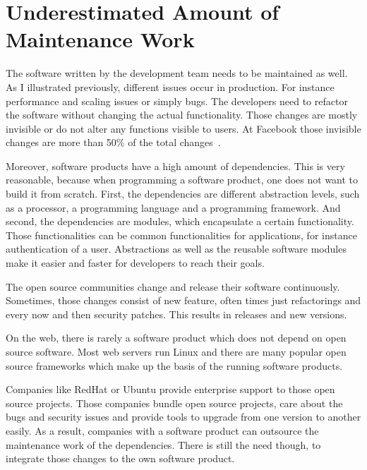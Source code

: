 \section{Underestimated Amount of Maintenance Work}

The software written by the development team needs to be maintained as well. As I
illustrated previously, different issues occur in production. For instance performance and
scaling issues or simply bugs. The developers need to refactor the software without
changing the actual functionality. Those changes are mostly invisible or do not alter any
functions visible to users. At Facebook those invisible changes are more than 50\% of the
total changes~\cite{dev_at_fb}.

Moreover, software products have a high amount of dependencies. This is very reasonable,
because when programming a software product, one does not want to build it from
scratch. First, the dependencies are different abstraction levels, such as a processor,
a programming language and a programming framework. And second, the dependencies are
modules, which encapsulate a certain functionality. Those functionalities can be common
functionalities for applications, for instance authentication of a user. Abstractions
as well as the reusable software modules make it easier and faster for developers to reach
their goals.

The open source communities change and release their software continuously. Sometimes,
those changes consist of new feature, often times just refactorings and every now and then
security patches. This results in releases and new versions.

On the web, there is rarely a software product which does not depend on open source
software. Most web servers run Linux and there are many popular open source frameworks
which make up the basis of the running software products.

Companies like RedHat or Ubuntu provide enterprise support to those open source
projects. Those companies bundle open source projects, care about the bugs and
security issues and provide tools to upgrade from one version to another easily. As a
result, companies with a software product can outsource the maintenance work of the
dependencies. There is still the need though, to integrate those changes to the own
software product.

